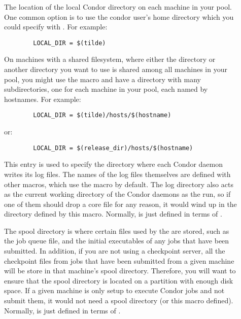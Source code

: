 \begin{description}
\item[] \label{param:LocalDir} The location of the
  local Condor directory on each machine in your pool.  One common
  option is to use the condor user's home directory which you could
  specify with .  For example:

\begin{verbatim}
        LOCAL_DIR = $(tilde)
\end{verbatim}
  
  On machines with a shared filesystem, where either the
   directory or another directory you want to use is
  shared among all machines in your pool, you might use the
   macro and have a directory with many
  subdirectories, one for each machine in your pool, each named by
  hostnames.  For example:

\begin{verbatim}
        LOCAL_DIR = $(tilde)/hosts/$(hostname)      
\end{verbatim}

  or:

\begin{verbatim}
        LOCAL_DIR = $(release_dir)/hosts/$(hostname)
\end{verbatim}

  
\item[] \label{param:Log} This entry is used to specify the
  directory where each Condor daemon writes its log files.  The names
  of the log files themselves are defined with other macros, which use
  the  macro by default.  The log directory also acts as
  the current working directory of the Condor daemons as the run, so
  if one of them should drop a core file for any reason, it would wind
  up in the directory defined by this macro.  Normally,  is
  just defined in terms of .
  
\item[] \label{param:Spool} The spool directory is where
  certain files used by the  are stored, such as the
  job queue file, and the initial executables of any jobs that have
  been submitted.  In addition, if you are not using a checkpoint
  server, all the checkpoint files from jobs that have been submitted
  from a given machine will be store in that machine's spool
  directory.  Therefore, you will want to ensure that the spool
  directory is located on a partition with enough disk space.  If a
  given machine is only setup to execute Condor jobs and not submit
  them, it would not need a spool directory (or this macro defined).
  Normally,  is just defined in terms of
  .
  

\end{description}
